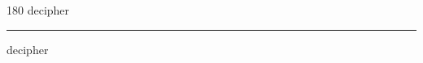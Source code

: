 
\begin{frame}
\begin{center}
\begin{turn}{180}
{\fontsize{2.5cm}{1em}\selectfont decipher}
\end{turn}
\vspace{1em}\par  
\hrule
\vspace{1em}\par  
{\fontsize{2.5cm}{1em}\selectfont decipher}
\end{center}
\end{frame}
